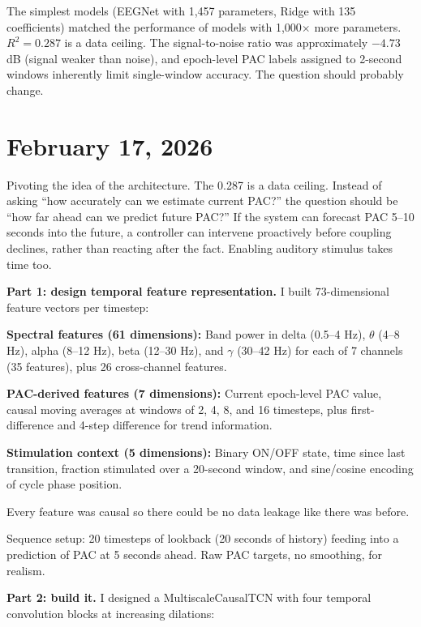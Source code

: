 \documentclass[11pt,letterpaper]{article}
\begin{document}
The simplest models (EEGNet with 1,457 parameters, Ridge with 135 coefficients) matched the
performance of models with 1,000$\times$ more parameters. $R^2 = 0.287$ is a data ceiling.
The signal-to-noise ratio was approximately $-4.73$ dB (signal weaker than noise), and
epoch-level PAC labels assigned to 2-second windows inherently limit single-window accuracy.
The question should probably change.

\section*{February 17, 2026}

Pivoting the idea of the architecture. The 0.287 is a data ceiling. Instead of asking ``how
accurately can we estimate current PAC?'' the question should be ``how far ahead can we predict
future PAC?'' If the system can forecast PAC 5--10 seconds into the future, a controller can
intervene proactively before coupling declines, rather than reacting after the fact. Enabling
auditory stimulus takes time too.

\textbf{Part 1: design temporal feature representation.} I built 73-dimensional feature vectors
per timestep:

\textbf{Spectral features (61 dimensions):} Band power in delta (0.5--4 Hz), $\theta$
(4--8 Hz), alpha (8--12 Hz), beta (12--30 Hz), and $\gamma$ (30--42 Hz) for each of 7 channels
(35 features), plus 26 cross-channel features.

\textbf{PAC-derived features (7 dimensions):} Current epoch-level PAC value, causal moving
averages at windows of 2, 4, 8, and 16 timesteps, plus first-difference and 4-step difference
for trend information.

\textbf{Stimulation context (5 dimensions):} Binary ON/OFF state, time since last transition,
fraction stimulated over a 20-second window, and sine/cosine encoding of cycle phase position.

Every feature was causal so there could be no data leakage like there was before.

Sequence setup: 20 timesteps of lookback (20 seconds of history) feeding into a prediction of
PAC at 5 seconds ahead. Raw PAC targets, no smoothing, for realism.

\textbf{Part 2: build it.} I designed a MultiscaleCausalTCN with four temporal convolution
blocks at increasing dilations:
\end{document}
